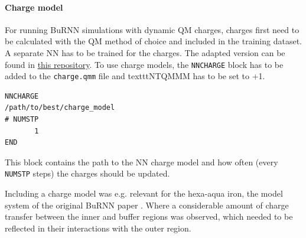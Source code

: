 \paragraph{Charge model}
For running BuRNN simulations with dynamic QM charges, charges first need to be calculated with the QM method of choice and included in the training dataset. A separate NN has to be trained for the charges. The adapted version can be found in \href{https://github.com/juliawestermayr/schnetpack}{this repository}.
To use charge models, the \texttt{NNCHARGE} block has to be added to the \texttt{charge.qmm} file and texttt{NTQMMM} has to be set to +1. 

\begin{lstlisting}[breaklines=true, breakatwhitespace=false]
NNCHARGE
/path/to/best/charge_model
# NUMSTP
       1
END
\end{lstlisting}

This block contains the path to the NN charge model and how often (every \texttt{NUMSTP} steps) the charges should be updated.

Including a charge model was e.g. relevant for the hexa-aqua iron, the model system of the original BuRNN paper \cite{Lier2022BuRNN}. Where a considerable amount of charge transfer between the inner and buffer regions was observed, which needed to be reflected in their interactions with the outer region.

